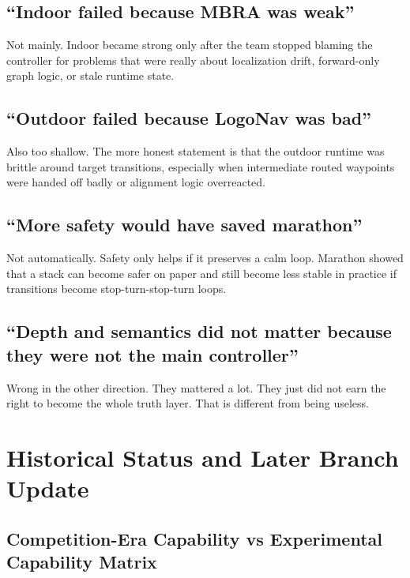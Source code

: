 \documentclass[11pt]{article}
\begin{document}
\subsection*{``Indoor failed because MBRA was weak''}

Not mainly. Indoor became strong only after the team stopped blaming the controller
for problems that were really about localization drift, forward-only graph logic, or
stale runtime state.

\subsection*{``Outdoor failed because LogoNav was bad''}

Also too shallow. The more honest statement is that the outdoor runtime was brittle
around target transitions, especially when intermediate routed waypoints were handed
off badly or alignment logic overreacted.

\subsection*{``More safety would have saved marathon''}

Not automatically. Safety only helps if it preserves a calm loop. Marathon showed
that a stack can become safer on paper and still become less stable in practice if
transitions become stop-turn-stop-turn loops.

\subsection*{``Depth and semantics did not matter because they were not the main controller''}

Wrong in the other direction. They mattered a lot. They just did not earn the right
to become the whole truth layer. That is different from being useless.

\section{Historical Status and Later Branch Update}

\subsection*{Competition-Era Capability vs Experimental Capability Matrix}
\end{document}
